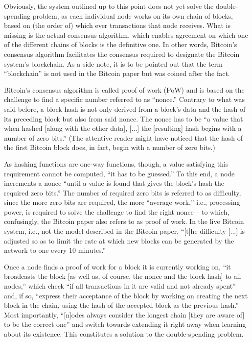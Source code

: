 Obviously, the system outlined up to this point does not yet solve the double-spending problem, as each individual node works on its own chain of blocks, based on (the order of) which ever transactions that node receives.
What is missing is the actual consensus algorithm, which enables agreement on which one of the different chains of blocks is the definitive one.
In other words, Bitcoin's consensus algorithm facilitates the consensus required to designate the Bitcoin system's blockchain.
As a side note, it is to be pointed out that the term ``blockchain'' is not used in the Bitcoin paper but was coined after the fact.

Bitcoin's consensus algorithm is called proof of work (PoW) and is based on the challenge to find a specific number referred to as ``nonce.'' \autocite[3]{bitcoin2008paper}
Contrary to what was said before, a block hash is not only derived from a block's data and the hash of its preceding block but also from said nonce.
The nonce has to be ``a value that when hashed [along with the other data], [...] the [resulting] hash begins with a number of zero bits.'' \autocite[3]{bitcoin2008paper}
(The attentive reader might have noticed that the hash of the first Bitcoin block does, in fact, begin with a number of zero bits.)

As hashing functions are one-way functions, though, a value satisfying this requirement cannot be computed, ``it has to be guessed.'' \autocite[7]{github2020blockchaintokens}
To this end, a node increments a nonce ``until a value is found that gives the block's hash the required zero bits.'' \autocite[3]{bitcoin2008paper}
The number of required zero bits is referred to as difficulty, since the more zero bits are required, the more ``average work,'' \autocite[3]{bitcoin2008paper} i.e., processing power, is required to solve the challenge to find the right nonce -- to which, confusingly, the Bitcoin paper also refers to as proof of work. \autocite[3]{bitcoin2008paper}
In the live Bitcoin system, i.e., not the model described in the Bitcoin paper, ``[t]he difficulty [...] is adjusted so as to limit the rate at which new blocks can be generated by the network to one every 10 minutes.'' \autocite{bitcoinwiki2020proofofwork}

Once a node finds a proof of work for a block it is currently working on, ``it broadcasts the block [as well as, of course, the nonce and the block hash] to all nodes,'' which check ``if all transactions in it are valid and not already spent'' and, if so, ``express their acceptance of the block by working on creating the next block in the chain, using the hash of the accepted block as the previous hash.'' \autocite[3]{bitcoin2008paper}
Most importantly, ``[n]odes always consider the longest chain [they are aware of] to be the correct one'' and switch towards extending it right away when learning about its existence. \autocite[3]{bitcoin2008paper}
This constitutes a solution to the double-spending problem.

